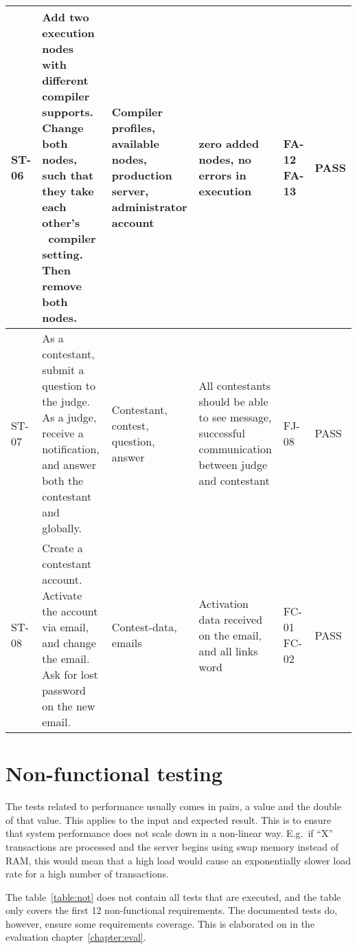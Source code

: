\begin{longtable}{|l|p{3cm}|p{3cm}|p{3cm}|p{1.1cm}|l|}
ST-06 & Add two execution nodes with different compiler supports. Change both
nodes, such that they take each other's \ compiler setting. Then remove both
nodes. &
Compiler profiles, available nodes, production server, administrator account &
zero added nodes, no errors in execution & FA-12 FA-13 & PASS\\
\hline 

ST-07 & As a contestant, submit a question to the judge. As a judge, receive a
notification, and answer both the contestant and globally. &
Contestant, contest, question, answer &
All contestants should be able to see message, successful communication between
judge and contestant & FJ-08 & PASS\\
\hline

ST-08 & Create a contestant account. Activate the account via email, and change
the email. Ask for lost password on the new  email. &
Contest-data, emails & Activation data received on the email, and all links
word & FC-01 FC-02 & PASS\\
\hline
\end{longtable}

\pagebreak
\section{Non-functional testing}

The tests related to performance usually comes in pairs, a value and the
double of that value. This applies to the input and expected result.
This is to ensure that system performance does not scale down in a
non-linear way. E.g.\ if ``X''
transactions are processed and the server begins using swap memory
instead of RAM, this would mean that a high load would cause an
exponentially slower load rate for a high number of transactions.


The table~\ref{table:not} does not contain all tests that
are executed, and the table only covers the first 12 non-functional
requirements. The documented tests do, however, ensure some
requirements coverage. This is elaborated on in the evaluation chapter~\ref{chapter:eval}.

